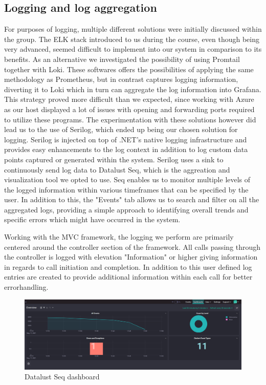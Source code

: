 \documentclass{article}
\begin{document}
\subsection{Logging and log aggregation}
For purposes of logging, multiple different solutions were initially discussed within the group. The ELK stack introduced to us during the course, even though being very advanced, seemed difficult to implement into our system in comparison to its benefits. 
As an alternative we investigated the possibility of using Promtail together with Loki. These softwares offers the possibilities of applying the same methodology as Prometheus, but in contrast captures logging information, diverting it to Loki which in turn can aggregate the log information into Grafana.
This strategy proved more difficult than we expected, since working with Azure as our host displayed a lot of issues with opening and forwarding ports required to utilize these programs.
The experimentation with these solutions however did lead us to the use of Serilog, which ended up being our chosen solution for logging.
Serilog is injected on top of .NET's native logging infrastructure and provides easy enhancements to the log context in addition to log custom data points captured or generated within the system.
Serilog uses a sink to continuously send log data to Datalust Seq, which is the aggreation and visualization tool we opted to use.
Seq enables us to monitor multiple levels of the logged information within various timeframes that can be specified by the user.
In addition to this, the "Events" tab allows us to search and filter on all the aggregated logs, providing a simple approach to identifying overall trends and specific errors which might have occurred in the system.

Working with the MVC framework, the logging we perform are primarily centered around the controller section of the framework. All calls passing through the controller is logged with elevation "Information" or higher giving information in regards to call initiation and completion. In addition to this user defined log entries are created to provide additional information within each call for better errorhandling.

\begin{figure}[H]
\centering
\includegraphics[width=1\textwidth]{images/DatalustSeq2.PNG}
\caption{\label{fig:seqdashboard} Datalust Seq dashboard}
\end{figure}
\end{document}
